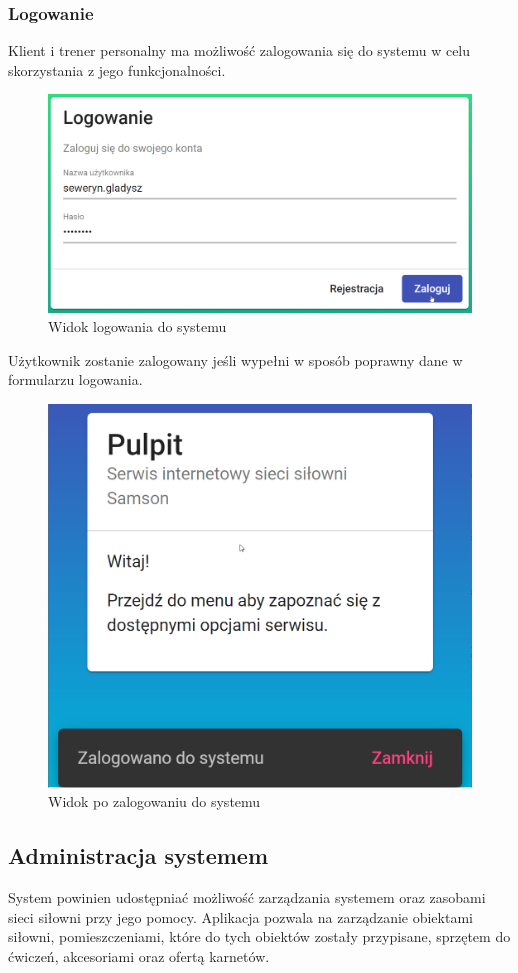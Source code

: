 \documentclass[a4paper,twoside,12pt]{book}
\begin{document}
\FloatBarrier

\subsubsection{Logowanie}
Klient i trener personalny ma możliwość zalogowania się do systemu w celu skorzystania z jego funkcjonalności.
\begin{figure}[h!]
	\centering
	\includegraphics[width=0.75\linewidth]{../zrzuty_ekranu/dzialanie/rejestracja_logowanie/logowanie}
	\caption{Widok logowania do systemu}
	\label{fig:logowanie}
\end{figure}
\FloatBarrier
Użytkownik zostanie zalogowany jeśli wypełni w sposób poprawny dane w formularzu logowania.
\begin{figure}[h!]
	\centering
	\includegraphics[width=0.75\linewidth]{../zrzuty_ekranu/dzialanie/rejestracja_logowanie/zalogowano}
	\caption{Widok po zalogowaniu do systemu}
	\label{fig:zalogowano}
\end{figure}
\FloatBarrier

\subsection{Administracja systemem}
System powinien udostępniać możliwość zarządzania systemem oraz zasobami sieci siłowni przy jego pomocy. Aplikacja pozwala na zarządzanie obiektami siłowni, pomieszczeniami, które do tych obiektów zostały przypisane, sprzętem do ćwiczeń, akcesoriami oraz ofertą karnetów.
\end{document}
